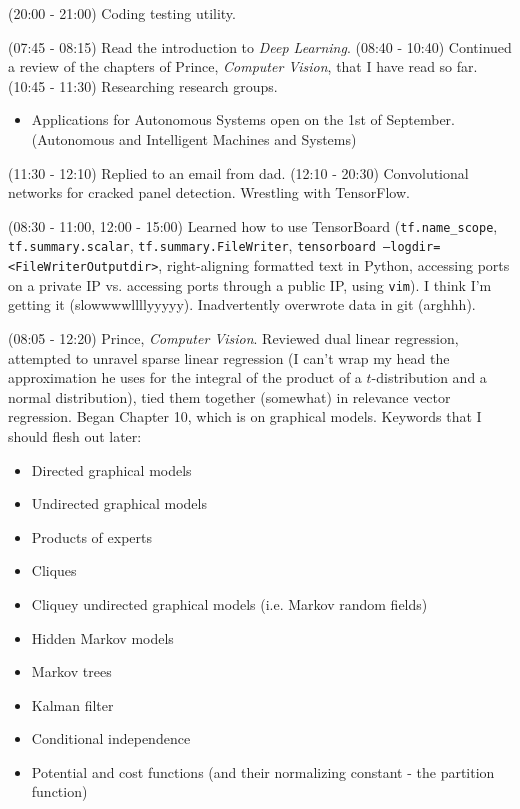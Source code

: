 \documentclass[idxtotoc,hyperref,openany]{labbook} %
\begin{document}
(20:00 - 21:00) Coding testing utility.


(07:45 - 08:15) Read the introduction to \emph{Deep Learning}.
(08:40 - 10:40) Continued a review of the chapters of Prince, \emph{Computer Vision}, that I have read so far.
(10:45 - 11:30) Researching research groups.
\begin{itemize}
	\item Applications for Autonomous Systems open on the 1st of September. (Autonomous and Intelligent Machines and Systems)
\end{itemize}
(11:30 - 12:10) Replied to an email from dad.
(12:10 - 20:30) Convolutional networks for cracked panel detection. Wrestling with TensorFlow.

(08:30 - 11:00, 12:00 - 15:00) Learned how to use TensorBoard (\texttt{tf.name\_scope}, \texttt{tf.summary.scalar}, \texttt{tf.summary.FileWriter}, \texttt{tensorboard --logdir=<FileWriterOutputdir>}, right-aligning formatted text in Python, accessing ports on a private IP vs. accessing ports through a public IP, using \texttt{vim}). I think I'm getting it (slowwwwllllyyyyy). Inadvertently overwrote data in git (arghhh).

(08:05 - 12:20) Prince, \emph{Computer Vision}. Reviewed dual linear regression, attempted to unravel sparse linear regression (I can't wrap my head the approximation he uses for the integral of the product of a $t$-distribution and a normal distribution), tied them together (somewhat) in relevance vector regression. Began Chapter 10, which is on graphical models. Keywords that I should flesh out later:
\begin{itemize}
	\item Directed graphical models
	\item Undirected graphical models
	\item Products of experts
	\item Cliques
	\item Cliquey undirected graphical models (i.e. Markov random fields)
	\item Hidden Markov models
	\item Markov trees
	\item Kalman filter
	\item Conditional independence
	\item Potential and cost functions (and their normalizing constant - the partition function)
\end{itemize}
\end{document}
